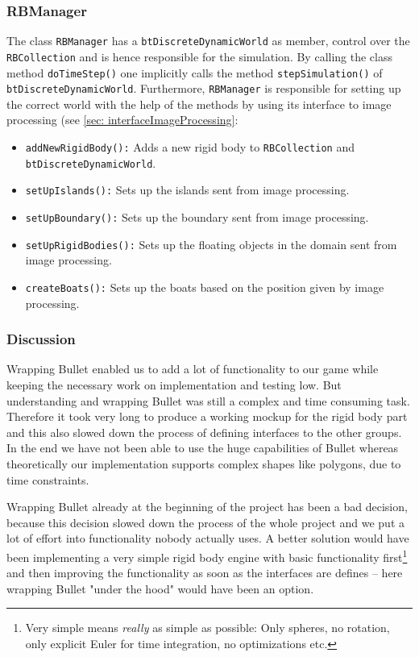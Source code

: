 \subsubsection*{RBManager}
\label{sec: rbManager}
The class \texttt{RBManager} has a \texttt{btDiscreteDynamicWorld} as member, control over the \texttt{RBCollection} and is hence responsible for the simulation. By calling the class method \texttt{doTimeStep()} one implicitly calls the method \texttt{stepSimulation()} of \texttt{btDiscreteDynamicWorld}. 
 Furthermore, \texttt{RBManager} is responsible for setting up the correct world with the help of the methods by using its  interface to image processing (see \autoref{sec: interfaceImageProcessing}:
\begin{itemize}
\item \texttt{addNewRigidBody():} Adds a new rigid body to \texttt{RBCollection} and \texttt{btDiscreteDynamicWorld}.
\item \texttt{setUpIslands():} Sets up the islands sent from image processing.
\item \texttt{setUpBoundary():} Sets up the boundary sent from image processing.
\item \texttt{setUpRigidBodies():} Sets up the floating objects in the domain sent from image processing.
\item \texttt{createBoats():} Sets up the boats based on the position given by image processing.
\end{itemize}

\subsubsection{Discussion}
Wrapping Bullet enabled us to add a lot of functionality to our game while keeping the necessary work on implementation and testing low. But understanding and wrapping Bullet was still a complex and time consuming task. Therefore it took very long to produce a working mockup for the rigid body part and this also slowed down the process of defining interfaces to the other groups. In the end we have not been able to use the huge capabilities of Bullet whereas theoretically our implementation supports complex shapes like polygons, due to time constraints.

Wrapping Bullet already at the beginning of the project has been a bad decision, because this decision slowed down the process of the whole project and we put a lot of effort into functionality nobody actually uses. A better solution would have been implementing a very simple rigid body engine with basic functionality first\footnote{Very simple means \emph{really} as simple as possible: Only spheres, no rotation, only explicit Euler for time integration, no optimizations etc.} and then improving the functionality as soon as the interfaces are defines -- here wrapping Bullet "under the hood" would have been an option.

